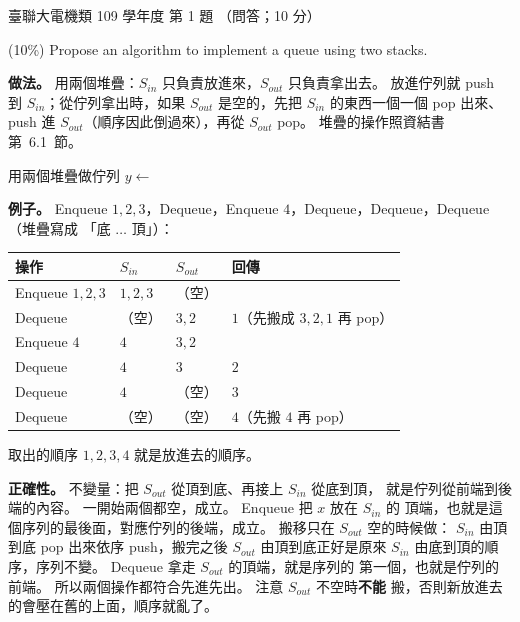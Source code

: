 \begin{pastexam}[label={px:ust-109-ee-ds-01}]{臺聯大電機類 109 學年度 第 1 題}
（問答；10 分）

(10\%) Propose an algorithm to implement a queue using two stacks.
\end{pastexam}

\begin{pastsoln}
\textbf{做法。} 用兩個堆疊：$S_{\mathit{in}}$ 只負責放進來，$S_{\mathit{out}}$ 只負責拿出去。
放進佇列就 push 到 $S_{\mathit{in}}$；從佇列拿出時，如果 $S_{\mathit{out}}$ 是空的，先把
$S_{\mathit{in}}$ 的東西一個一個 pop 出來、push 進 $S_{\mathit{out}}$（順序因此倒過來），再從
$S_{\mathit{out}}$ pop。 堆疊的操作照資結書第~6.1~節。

\begin{pseudo}{用兩個堆疊做佇列}
    \State {}
\EndProcedure
\Statex
{}
            \State $y \gets$ 
            \State {}
        \EndWhile
    \EndIf
        \State {} 
    \EndIf
    \State \Return {}
\EndFunction
\end{pseudo}

\textbf{例子。} Enqueue $1, 2, 3$，Dequeue，Enqueue $4$，Dequeue，Dequeue，Dequeue（堆疊寫成
「底 $\ldots$ 頂」）：
\begin{center}
\small
\begin{tabular}{llll}
\toprule
操作 & $S_{\mathit{in}}$ & $S_{\mathit{out}}$ & 回傳 \\
\midrule
Enqueue $1, 2, 3$ & $1, 2, 3$ & （空） & \\
Dequeue & （空） & $3, 2$ & $1$（先搬成 $3, 2, 1$ 再 pop） \\
Enqueue $4$ & $4$ & $3, 2$ & \\
Dequeue & $4$ & $3$ & $2$ \\
Dequeue & $4$ & （空） & $3$ \\
Dequeue & （空） & （空） & $4$（先搬 $4$ 再 pop） \\
\bottomrule
\end{tabular}
\end{center}
取出的順序 $1, 2, 3, 4$ 就是放進去的順序。

\textbf{正確性。} 不變量：把 $S_{\mathit{out}}$ 從頂到底、再接上 $S_{\mathit{in}}$ 從底到頂，
就是佇列從前端到後端的內容。 一開始兩個都空，成立。 Enqueue 把 $x$ 放在 $S_{\mathit{in}}$ 的
頂端，也就是這個序列的最後面，對應佇列的後端，成立。 搬移只在 $S_{\mathit{out}}$ 空的時候做：
$S_{\mathit{in}}$ 由頂到底 pop 出來依序 push，搬完之後 $S_{\mathit{out}}$ 由頂到底正好是原來
$S_{\mathit{in}}$ 由底到頂的順序，序列不變。 Dequeue 拿走 $S_{\mathit{out}}$ 的頂端，就是序列的
第一個，也就是佇列的前端。 所以兩個操作都符合先進先出。 注意 $S_{\mathit{out}}$ 不空時\textbf{不能}
搬，否則新放進去的會壓在舊的上面，順序就亂了。


\end{pastsoln}
